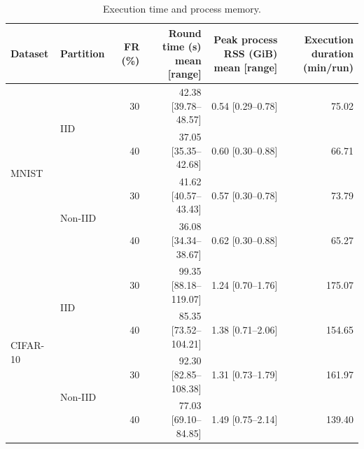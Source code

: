 \begin{table}[t]
\centering\footnotesize\setlength{\tabcolsep}{4pt}
\caption{Execution time and process memory.}\label{tab:cost}
\begin{tabular}{llrrrr}
\toprule
Dataset & Partition & FR (\%) & \shortstack{Round time (s)\\mean [range]} & \shortstack{Peak process RSS (GiB)\\mean [range]} & \shortstack{Execution duration\\(min/run)} \\
\midrule
\multirow{4}{*}{MNIST} & \multirow{2}{*}{IID} & 30 & 42.38 [39.78--48.57] & 0.54 [0.29--0.78] & 75.02 \\
 &  & 40 & 37.05 [35.35--42.68] & 0.60 [0.30--0.88] & 66.71 \\
 & \multirow{2}{*}{Non-IID} & 30 & 41.62 [40.57--43.43] & 0.57 [0.30--0.78] & 73.79 \\
 &  & 40 & 36.08 [34.34--38.67] & 0.62 [0.30--0.88] & 65.27 \\
\midrule
\multirow{4}{*}{CIFAR-10} & \multirow{2}{*}{IID} & 30 & 99.35 [88.18--119.07] & 1.24 [0.70--1.76] & 175.07 \\
 &  & 40 & 85.35 [73.52--104.21] & 1.38 [0.71--2.06] & 154.65 \\
 & \multirow{2}{*}{Non-IID} & 30 & 92.30 [82.85--108.38] & 1.31 [0.73--1.79] & 161.97 \\
 &  & 40 & 77.03 [69.10--84.85] & 1.49 [0.75--2.14] & 139.40 \\
\bottomrule
\end{tabular}
\end{table}
